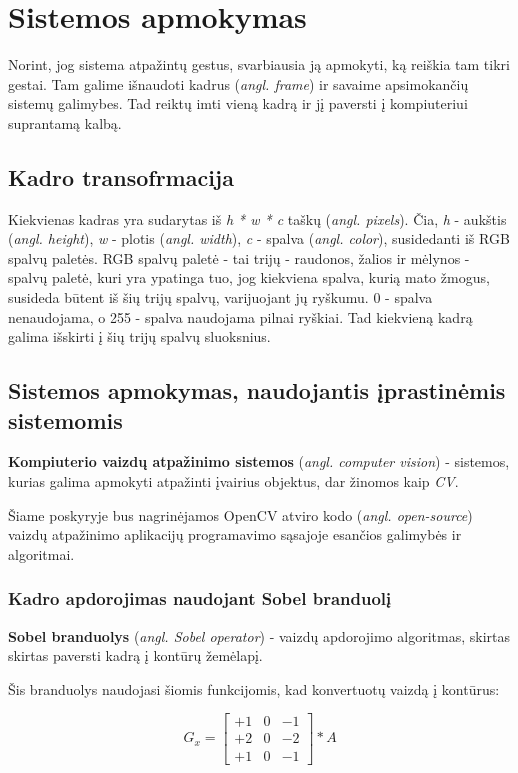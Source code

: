 \documentclass{VUMIFInfKursinis}
\begin{document}
\section{Sistemos apmokymas}
Norint, jog sistema atpažintų gestus, svarbiausia ją apmokyti, ką reiškia tam tikri gestai. Tam galime išnaudoti kadrus (\textit{angl. frame}) ir savaime apsimokančių sistemų galimybes. Tad reiktų imti vieną kadrą ir jį paversti į kompiuteriui suprantamą kalbą. 

\subsection{Kadro transofrmacija}
Kiekvienas kadras yra sudarytas iš \textit{h * w * c} taškų (\textit{angl. pixels}). Čia, \textit{h} - aukštis (\textit{angl. height}), \textit{w} - plotis (\textit{angl. width}), \textit{c} - spalva (\textit{angl. color}), susidedanti iš RGB spalvų paletės. RGB spalvų paletė - tai trijų - raudonos, žalios ir mėlynos - spalvų paletė, kuri yra ypatinga tuo, jog kiekviena spalva, kurią mato žmogus, susideda būtent iš šių trijų spalvų, varijuojant jų ryškumu. 0 - spalva nenaudojama, o 255 - spalva naudojama pilnai ryškiai. Tad kiekvieną kadrą galima išskirti į šių trijų spalvų sluoksnius.

\subsection{Sistemos apmokymas, naudojantis įprastinėmis sistemomis}
\textbf{Kompiuterio vaizdų atpažinimo sistemos} (\textit{angl. computer vision}) - sistemos, kurias galima apmokyti atpažinti įvairius objektus, dar žinomos kaip \textit{CV}.

Šiame poskyryje bus nagrinėjamos OpenCV atviro kodo (\textit{angl. open-source}) vaizdų atpažinimo aplikacijų programavimo sąsajoje esančios galimybės ir algoritmai.


\subsubsection{Kadro apdorojimas naudojant Sobel branduolį}
\textbf{Sobel branduolys} (\textit{angl. Sobel operator}) - vaizdų apdorojimo algoritmas, skirtas skirtas paversti kadrą į kontūrų žemėlapį.

Šis branduolys naudojasi šiomis funkcijomis, kad konvertuotų vaizdą į kontūrus:

\begin{equation}\label{eq:sobelgx}
	G_x = 
	\begin{bmatrix}
	+1 & 0 & -1 \\
	+2 & 0 & -2 \\
	+1 & 0 & -1
	\end{bmatrix} * A
\end{equation}
	
\end{document}
